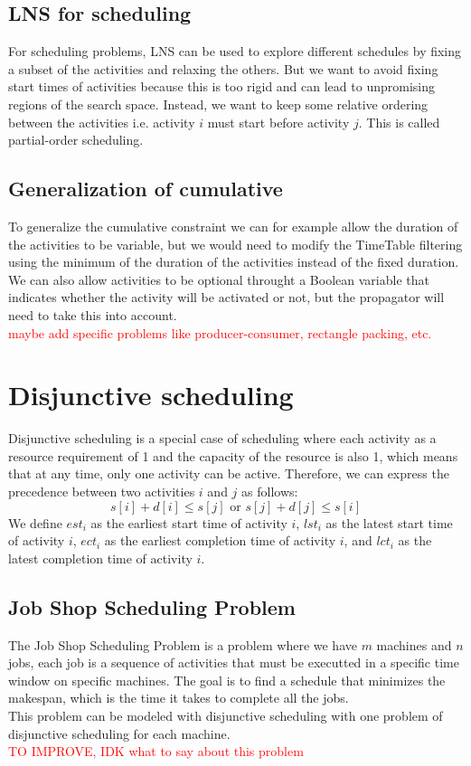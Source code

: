 \documentclass[12pt, openany]{report}
\theoremstyle{definition}
\begin{document}
\subsection{LNS for scheduling}
For scheduling problems, LNS can be used to explore different schedules by fixing a subset of the activities and relaxing the others. But we want to avoid fixing start times of activities because this is too rigid and can lead to unpromising regions of the search space. Instead, we want to keep some relative ordering between the activities i.e. activity $i$ must start before activity $j$. This is called partial-order scheduling.
\subsection{Generalization of cumulative}
To generalize the cumulative constraint we can for example allow the duration of the activities to be variable, but we would need to modify the TimeTable filtering using the minimum of the duration of the activities instead of the fixed duration. We can also allow activities to be optional throught a Boolean variable that indicates whether the activity will be activated or not, but the propagator will need to take this into account.\\
\textcolor{red}{maybe add specific problems like producer-consumer, rectangle packing, etc.}
\section{Disjunctive scheduling}
Disjunctive scheduling is a special case of scheduling where each activity as a resource requirement of 1 and the capacity of the resource is also 1, which means that at any time, only one activity can be active. Therefore, we can express the precedence between  two activities $i$ and $j$ as follows:
\begin{equation}
    s[i] + d[i] \leq s[j] \text{ or } s[j] + d[j] \leq s[i]
\end{equation}
We define $est_i$ as the earliest start time of activity $i$, $lst_i$ as the latest start time of activity $i$, $ect_i$ as the earliest completion time of activity $i$, and $lct_i$ as the latest completion time of activity $i$.
\subsection{Job Shop Scheduling Problem}
The Job Shop Scheduling Problem is a problem where we have $m$ machines and $n$ jobs, each job is a sequence of activities that must be executted in a specific time window on specific machines. The goal is to find a schedule that minimizes the makespan, which is the time it takes to complete all the jobs.\\
This problem can be modeled with disjunctive scheduling with one problem of disjunctive scheduling for each machine.\\
\textcolor{red}{TO IMPROVE, IDK what to say about this problem}
\end{document}
